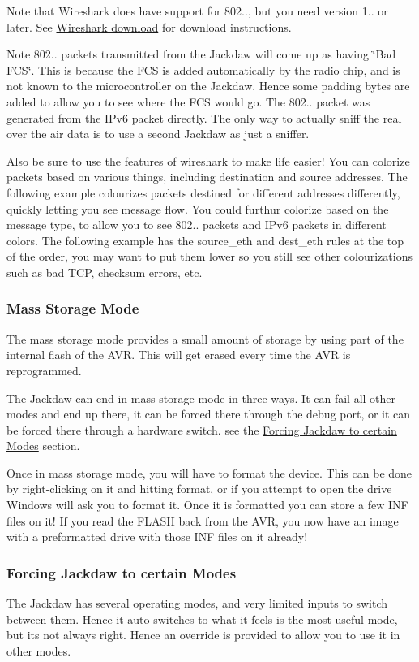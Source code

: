 Note that Wireshark does have support for 802.., but you need version 1.. or later. See \hyperlink{a00067_annex_wireshark}{Wireshark download} for download instructions.

\begin{DoxyNote}{Note}
802.. packets transmitted from the Jackdaw will come up as having \char`\"{}\+Bad F\+C\+S\char`\"{}. This is because the F\+CS is added automatically by the radio chip, and is not known to the microcontroller on the Jackdaw. Hence some padding bytes are added to allow you to see where the F\+CS would go. The 802.. packet was generated from the I\+Pv6 packet directly. The only way to actually sniff the real over the air data is to use a second Jackdaw as just a sniffer.
\end{DoxyNote}
Also be sure to use the features of wireshark to make life easier! You can colorize packets based on various things, including destination and source addresses. The following example colourizes packets destined for different addresses differently, quickly letting you see message flow. You could furthur colorize based on the message type, to allow you to see 802.. packets and I\+Pv6 packets in different colors. The following example has the \textquotesingle{}source\+\_\+eth\textquotesingle{} and \textquotesingle{}dest\+\_\+eth\textquotesingle{} rules at the top of the order, you may want to put them lower so you still see other colourizations such as bad T\+CP, checksum errors, etc.

\hypertarget{a00067_MassStorageMode}{}\subsubsection{Mass Storage Mode}\label{a00067_MassStorageMode}
The mass storage mode provides a small amount of storage by using part of the internal flash of the A\+VR. This will get erased every time the A\+VR is reprogrammed.

The Jackdaw can end in mass storage mode in three ways. It can fail all other modes and end up there, it can be forced there through the debug port, or it can be forced there through a hardware switch. see the \hyperlink{a00067_hardwareforce}{Forcing Jackdaw to certain Modes} section.

Once in mass storage mode, you will have to format the device. This can be done by right-\/clicking on it and hitting format, or if you attempt to open the drive Windows will ask you to format it. Once it is formatted you can store a few I\+NF files on it! If you read the F\+L\+A\+SH back from the A\+VR, you now have an image with a preformatted drive with those I\+NF files on it already!\hypertarget{a00067_hardwareforce}{}\subsubsection{Forcing Jackdaw to certain Modes}\label{a00067_hardwareforce}
The Jackdaw has several operating modes, and very limited inputs to switch between them. Hence it auto-\/switches to what it feels is the most useful mode, but it\textquotesingle{}s not always right. Hence an override is provided to allow you to use it in other modes.

